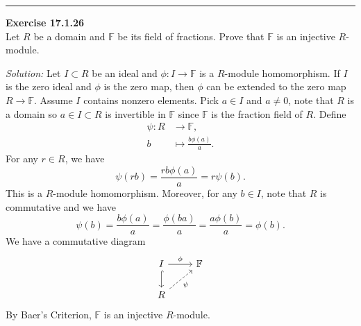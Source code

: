 \documentclass[a4paper, 12pt]{article}
\newenvironment{problem}[2][Exercise]
    { \begin{mdframed}[backgroundcolor=gray!20] \textbf{#1 #2} \\}
    {  \end{mdframed}}
\newenvironment{solution}
    {\textit{Solution:}}
    {}
\begin{document}
\noindent\rule{7in}{2.8pt}
\begin{problem}{17.1.26}
Let \(R\) be a domain and \(\mathbb{F}\) be its field of fractions. Prove that \(\mathbb{F}\) is an injective \(R\)-module.
\end{problem}
\begin{solution}
Let \(I\subset R\) be an ideal and \(\phi:I\rightarrow \mathbb{F}\) is a \(R\)-module homomorphism. If \(I\) is the zero ideal and \(\phi\) is the zero map, then \(\phi\) can be extended to the zero map 
\(R\rightarrow \mathbb{F}\). Assume \(I\) contains nonzero elements. Pick \(a\in I\) and \(a\neq 0\), note that \(R\) is a domain so \(a\in I\subset R\) is invertible in \(\mathbb{F}\) since \(\mathbb{F}\) is the fraction field of \(R\). Define 
\begin{align*}
    \psi:R&\rightarrow \mathbb{F},\\ 
         b&\mapsto \frac{b\phi(a)}{a}.
\end{align*}
For any \(r\in R\), we have 
\[\psi(rb)=\frac{rb\phi(a)}{a}=r\psi(b).\]
This is a \(R\)-module homomorphism. Moreover, for any \(b\in I\), note that \(R\) is commutative and we have 
\[\psi(b)=\frac{b\phi(a)}{a}=\frac{\phi(ba)}{a}=\frac{a\phi(b)}{a}=\phi(b).\]
We have a commutative diagram 
\[\begin{tikzcd}
	I & {\mathbb{F}} \\
	R
	\arrow["\phi", from=1-1, to=1-2]
	\arrow[hook, from=1-1, to=2-1]
	\arrow["\psi"', dashed, from=2-1, to=1-2]
\end{tikzcd}\]
By Baer's Criterion, \(\mathbb{F}\) is an injective \(R\)-module. 
\end{solution}
\end{document}
